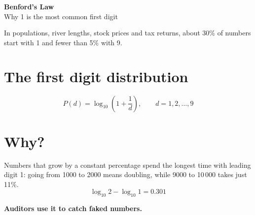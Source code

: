 \documentclass[11pt]{article}
\begin{document}
\begin{center}
  {\LARGE\bfseries Benford's Law}\\[4pt]
  {\large Why 1 is the most common first digit}
\end{center}

In populations, river lengths, stock prices and tax returns,
about 30\% of numbers start with 1 and fewer than 5\% with 9.

\section*{The first digit distribution}
\[
  P(d) = \log_{10}\left(1 + \frac{1}{d}\right),
  \qquad d = 1, 2, \dots, 9
\]

\begin{center}
\end{center}

\section*{Why?}
Numbers that grow by a constant percentage spend the
longest time with leading digit 1: going from 1000 to 2000
means doubling, while 9000 to 10\,000 takes just 11\%.
\[
  \log_{10} 2 - \log_{10} 1 = 0.301
\]
\centerline{\bfseries Auditors use it to catch faked numbers.}
\end{document}
